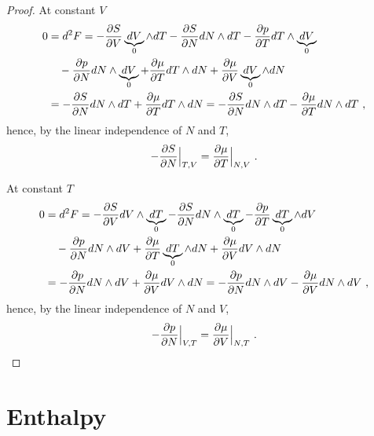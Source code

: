 \begin{proof}
        At constant $V$ 
        \begin{equation*}
        \begin{aligned}
            0 & = d^2 F = - \frac{\partial S}{\partial V} \underbrace{dV}_0 \wedge dT - \frac{\partial S}{\partial N} dN \wedge dT - \frac{\partial p}{\partial T} dT \wedge \underbrace{dV}_0 \\ & \quad - \frac{\partial p}{\partial N} dN \wedge \underbrace{dV}_0 + \frac{\partial\mu}{\partial T} dT \wedge dN + \frac{\partial\mu}{\partial V} \underbrace{dV}_0 \wedge dN \\ & = - \frac{\partial S}{\partial N} dN \wedge dT + \frac{\partial\mu}{\partial T} dT \wedge dN = - \frac{\partial S}{\partial N} dN \wedge dT - \frac{\partial\mu}{\partial T} dN \wedge dT~,
        \end{aligned}
        \end{equation*}
        hence, by the linear independence of $N$ and $T$,
        \begin{equation*}
            - \frac{\partial S}{\partial N} \Big \vert_{T,V} = \frac{\partial\mu}{\partial T} \Big \vert_{N, V} ~.
        \end{equation*}

        At constant $T$ 
        \begin{equation*}
        \begin{aligned}
            0 & = d^2 F = - \frac{\partial S}{\partial V} dV \wedge \underbrace{dT}_0 - \frac{\partial S}{\partial N} dN \wedge \underbrace{dT}_0 - \frac{\partial p}{\partial T} \underbrace{dT}_0 \wedge dV \\ & \quad - \frac{\partial p}{\partial N} dN \wedge dV + \frac{\partial\mu}{\partial T} \underbrace{dT}_0 \wedge dN + \frac{\partial\mu}{\partial V} dV \wedge dN \\ & = - \frac{\partial p}{\partial N} dN \wedge dV + \frac{\partial\mu}{\partial V} dV \wedge dN =- \frac{\partial p}{\partial N} dN \wedge dV - \frac{\partial\mu}{\partial V} dN \wedge dV ~,
        \end{aligned}
        \end{equation*}
        hence, by the linear independence of $N$ and $V$,
        \begin{equation*}
            - \frac{\partial p}{\partial N} \Big \vert_{V,T} = \frac{\partial\mu}{\partial V} \Big \vert_{N, T} ~.
        \end{equation*}
    \end{proof}

\section{Enthalpy} 

